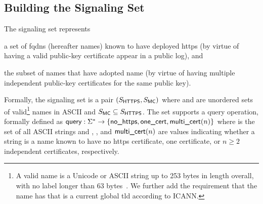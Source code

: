 
\subsection{Building the Signaling Set}
\label{sec:design:signaling}

The signaling set represents
\begin{inparaenum}
\item a set of \acp{fqdn} (hereafter names) known to have deployed \ac{https}
  (by virtue of having a valid public-key certificate appear in a public log), and
\item the subset of names that have adopted \ac{name} (by
  virtue of having multiple independent public-key certificates for the same
  public key).
\end{inparaenum}
Formally, the signaling set is a pair $(S_{\textsf{HTTPS}}, S_{\textsf{MC}})$ where
\httpsset and \multicertset are unordered sets of valid\footnote{A valid
  name is a Unicode or ASCII string up to 253 bytes in length overall,
  with no label longer than 63 bytes~\cite{rfc1035}. We further add the
requirement that the name has  that is a current global \ac{tld}
according to ICANN.} names in ASCII and $S_{\textsf{MC}} \subseteq
S_{\textsf{HTTPS}}$. The set supports a query operation, formally defined as $\textsf{query}:
\Sigma^* \to \{\textsf{no\_https}, \textsf{one\_cert}, \textsf{multi\_cert}(n)\}$ where \strings is the set of
all ASCII strings and \nohttps, \onecert, and $\textsf{multi\_cert}(n)$ are values indicating
whether a string is a name known to have no \ac{https} certificate, one
certificate, or $n\geq 2$ independent certificates, respectively.

